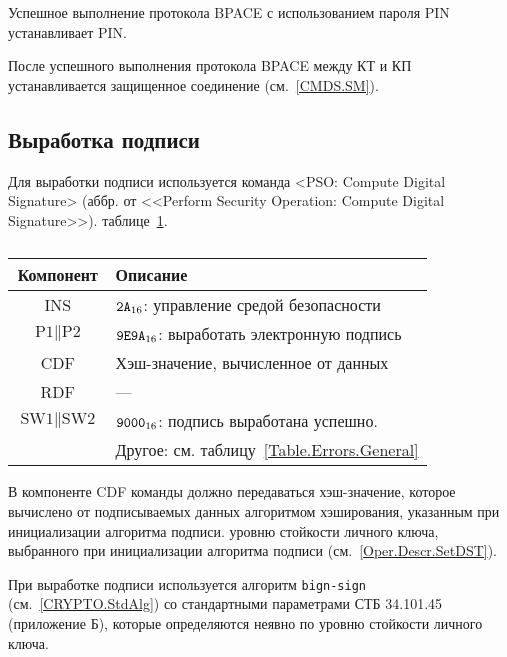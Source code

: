 Успешное выполнение протокола BPACE с использованием пароля PIN 
устанавливает  PIN.

После успешного выполнения протокола BPACE между КТ и КП 
устанавливается защищенное соединение (см.~\ref{CMDS.SM}).

\subsection{Выработка подписи}
\label{Oper.Descr.Signature}

Для выработки подписи используется 
команда <PSO: Compute Digital Signature>
(аббр. от <<Perform Security Operation: Compute Digital Signature>>).
 таблице~\ref{Table.Oper.SignatureCmd}.

\begin{table}[hbt]
\caption{}\label{Table.Oper.SignatureCmd}
\begin{tabular}{|c|p{14cm}|}
\hline
Компонент & Описание\\ 
\hline
\hline
INS & $\texttt{2A}_{16}$: управление средой безопасности \\
\hline
$\text{P1} \parallel \text{P2}$ & $\texttt{9E9A}_{16}$: выработать
электронную подпись \\ 
\hline
CDF & Хэш-значение, вычисленное от данных\\
\hline 
RDF &  --- \\
\hline
$\text{SW1} \parallel \text{SW2}$ & 
  $\texttt{9000}_{16}$: подпись выработана успешно. \\
  & Другое: см. таблицу~\ref{Table.Errors.General} \\
\hline
\end{tabular}
\end{table}

В компоненте CDF команды должно передаваться хэш-значение, которое вычислено
от подписываемых данных алгоритмом хэширования, указанным 
при инициализации алгоритма подписи.  уровню стойкости личного ключа, выбранного при инициализации 
алгоритма подписи (см.~\ref{Oper.Descr.SetDST}).

При выработке подписи используется алгоритм \texttt{bign-sign}
(см.~\ref{CRYPTO.StdAlg}) со стандартными параметрами СТБ 34.101.45 
(приложение Б), которые определяются неявно по уровню стойкости личного ключа.

